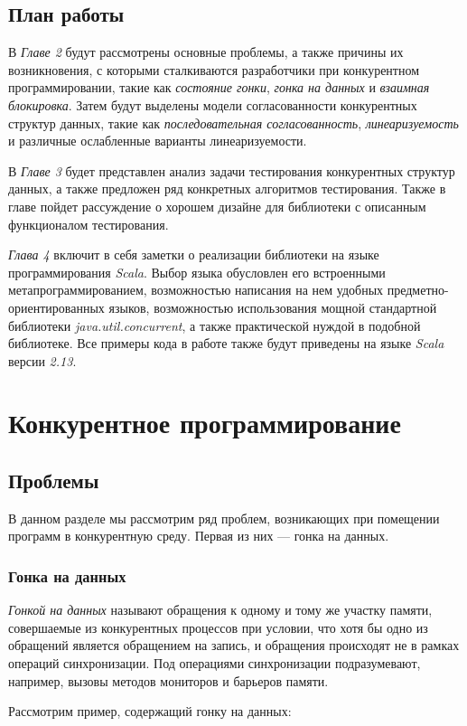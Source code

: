 \documentclass[14pt, openany]{book}
\begin{document}
\section{План работы}
В \textit{Главе 2} будут рассмотрены основные проблемы, а также причины их возникновения, с которыми сталкиваются разработчики при конкурентном программировании, такие как \textit{состояние гонки}, \textit{гонка на данных} и \textit{взаимная блокировка}. Затем будут выделены модели согласованности конкурентных структур данных, такие как \textit{последовательная согласованность}, \textit{линеаризуемость} и различные ослабленные варианты линеаризуемости.\par
В \textit{Главе 3} будет представлен анализ задачи тестирования конкурентных структур данных, а также предложен ряд конкретных алгоритмов тестирования. Также в главе пойдет рассуждение о хорошем дизайне для библиотеки с описанным функционалом тестирования. \par
\textit{Глава 4} включит в себя заметки о реализации библиотеки на языке программирования \textit{Scala}. Выбор языка обусловлен его встроенными метапрограммированием, возможностью написания на нем удобных предметно-ориентированных языков, возможностью использования мощной стандартной библиотеки \linebreak \textit{java.util.concurrent}, а также практической нуждой в подобной библиотеке. Все примеры кода в работе также будут приведены на языке \textit{Scala} версии \textit{2.13}.

\chapter{Конкурентное программирование}

\section{Проблемы}
В данном разделе мы рассмотрим ряд проблем, возникающих при помещении программ в конкурентную среду.
Первая из них --- гонка на данных.

\subsection{Гонка на данных}
\textit{Гонкой на данных} называют \cite{dataRace} обращения к одному и тому же участку памяти, совершаемые из конкурентных процессов при условии, что хотя бы одно из обращений является обращением на запись, и обращения происходят не в рамках операций синхронизации. Под операциями синхронизации подразумевают, например, вызовы методов мониторов и барьеров памяти.
\par Рассмотрим пример, содержащий гонку на данных:
\end{document}
